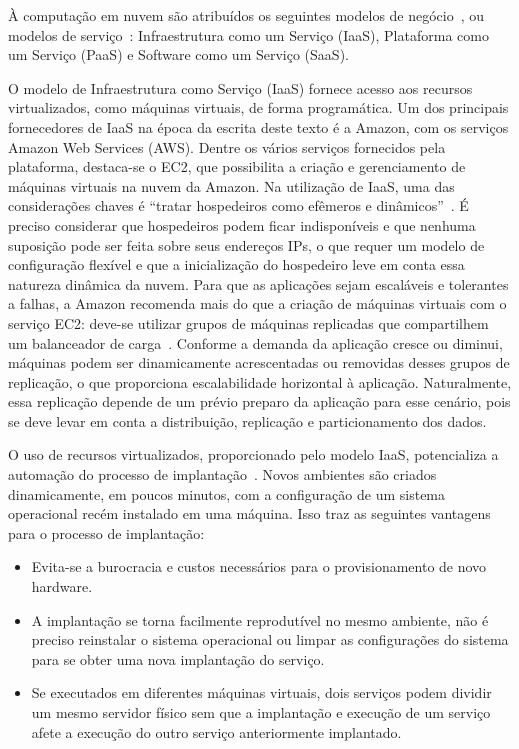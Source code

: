 À computação em nuvem são atribuídos os seguintes modelos de negócio~\cite{Zhang2010Cloud}, ou modelos de serviço~\cite{Nist2011Cloud}: Infraestrutura como um Serviço (IaaS), Plataforma como um Serviço (PaaS) e Software como um Serviço (SaaS). 

O modelo de Infraestrutura como Serviço (IaaS) fornece acesso aos recursos virtualizados, como máquinas virtuais, de forma programática. Um dos principais fornecedores de IaaS na época da escrita deste texto é a Amazon, com os serviços Amazon Web Services (AWS). Dentre os vários serviços fornecidos pela plataforma, destaca-se o EC2, que possibilita a criação e gerenciamento de máquinas virtuais na nuvem da Amazon. Na utilização de IaaS, uma das considerações chaves é ``tratar hospedeiros como efêmeros e dinâmicos''~\cite{Amazon2012Practices}. É preciso considerar que hospedeiros podem ficar indisponíveis e que nenhuma suposição pode ser feita sobre seus endereços IPs, o que requer um modelo de configuração flexível e que a inicialização do hospedeiro leve em conta essa natureza dinâmica da nuvem. Para que as aplicações sejam escaláveis e tolerantes a falhas, a Amazon recomenda mais do que a criação de máquinas virtuais com o serviço EC2: deve-se utilizar grupos de máquinas replicadas que compartilhem um balanceador de carga~\cite{Amazon2012Practices}. Conforme a demanda da aplicação cresce ou diminui, máquinas podem ser dinamicamente acrescentadas ou removidas desses grupos de replicação, o que proporciona escalabilidade horizontal à aplicação. Naturalmente, essa replicação depende de um prévio preparo da aplicação para esse cenário, pois se deve levar em conta a distribuição, replicação e particionamento dos dados. 

O uso de recursos virtualizados, proporcionado pelo modelo IaaS,
potencializa a automação do processo de implantação~\cite{Humble2011Continuous}.
Novos ambientes são criados dinamicamente, em poucos minutos,
com a configuração de um sistema operacional recém instalado em uma máquina.
Isso traz as seguintes vantagens para o processo de implantação:

\begin{itemize}
\item Evita-se a burocracia e custos necessários para o provisionamento de novo hardware.
\item A implantação se torna facilmente reprodutível no mesmo ambiente, não é preciso reinstalar o sistema operacional ou limpar as configurações do sistema para se obter uma nova implantação do serviço.
\item Se executados em diferentes máquinas virtuais, dois serviços podem dividir um mesmo servidor físico sem que a implantação e execução de um serviço afete a execução do outro serviço anteriormente implantado.
\end{itemize}

